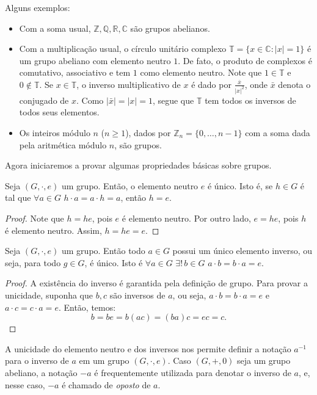 Alguns exemplos:

\begin{itemize}
    \item Com a soma usual, $\mathbb{Z, Q, R, C}$ são grupos abelianos.
    \item Com a multiplicação usual, o círculo unitário complexo $\mathbb T=\{x \in \mathbb C: |x|=1\}$ é um grupo abeliano com elemento neutro $1$. De fato, o produto de complexos é comutativo, associativo e tem $1$ como elemento neutro. Note que $1\in \mathbb T$ e $0\notin \mathbb T$. Se $x \in \mathbb T$, o inverso multiplicativo de $x$ é dado por $\frac{\bar x}{|x|^2}$, onde $\bar x$ denota o conjugado de $x$. Como $|\bar x|=|x|=1$, segue que $\mathbb T$ tem todos os inversos de todos seus elementos.
    \item Os inteiros módulo $n$ ($n\geq 1$), dados por $\mathbb Z_n=\{0, \dots, n-1\}$ com a soma dada pela aritmética módulo $n$, são grupos.
\end{itemize}

Agora iniciaremos a provar algumas propriedades básicas sobre grupos.
\begin{prop}
    Seja $(G,\cdot,e)$ um grupo. Então, o elemento neutro $e$ é único. Isto é, se $h \in G$ é tal que $\forall a \in G$ $h \cdot a = a \cdot h = a$, então $h = e$.
\end{prop}
\begin{proof}
    Note que $h=he$, pois $e$ é elemento neutro. Por outro lado, $e=he$, pois $h$ é elemento neutro. Assim, $h=he=e$.
\end{proof}

\begin{prop}\label{prop:inverso_unico_grupo}
    Seja $(G,\cdot,e)$ um grupo. Então todo $a \in G$ possui um único elemento inverso, ou seja, para todo $g \in G$,  é único. Isto é $\forall a \in G$ $\exists!\, b \in G$ $a \cdot b = b \cdot a = e$.
\end{prop}
\begin{proof}
    A existência do inverso é garantida pela definição de grupo. Para provar a unicidade, suponha que $b, c$ são inversos de $a$, ou seja, $a \cdot b = b \cdot a = e$ e $a \cdot c = c \cdot a = e$.
    Então, temos:
    $$b=be=b(ac)=(ba)c=ec=c.$$
\end{proof}

A unicidade do elemento neutro e dos inversos nos permite definir a notação $a^{-1}$ para o inverso de $a$ em um grupo $(G,\cdot,e)$. Caso $(G, +, 0)$ seja um grupo abeliano, a notação $-a$ é frequentemente utilizada para denotar o inverso de $a$, e, nesse caso, $-a$ é chamado de \emph{oposto} de $a$.

